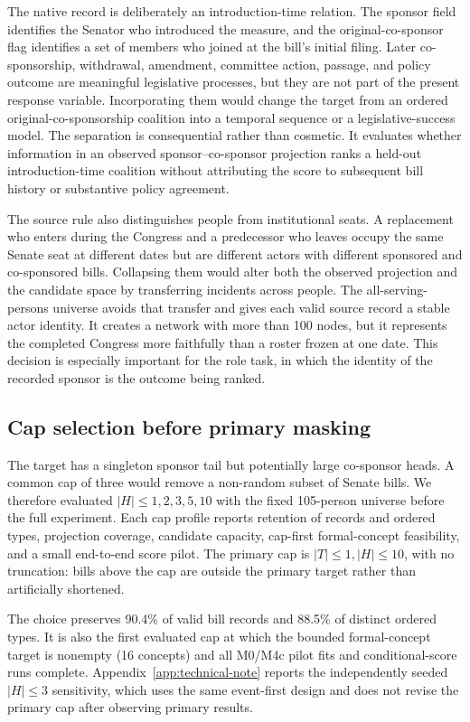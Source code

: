 \documentclass{nws}
\begin{document}
The native record is deliberately an introduction-time relation. The sponsor field identifies the Senator who introduced the measure, and the original-co-sponsor flag identifies a set of members who joined at the bill's initial filing. Later co-sponsorship, withdrawal, amendment, committee action, passage, and policy outcome are meaningful legislative processes, but they are not part of the present response variable. Incorporating them would change the target from an ordered original-co-sponsorship coalition into a temporal sequence or a legislative-success model. The separation is consequential rather than cosmetic. It evaluates whether information in an observed sponsor--co-sponsor projection ranks a held-out introduction-time coalition without attributing the score to subsequent bill history or substantive policy agreement.

The source rule also distinguishes people from institutional seats. A replacement who enters during the Congress and a predecessor who leaves occupy the same Senate seat at different dates but are different actors with different sponsored and co-sponsored bills. Collapsing them would alter both the observed projection and the candidate space by transferring incidents across people. The all-serving-persons universe avoids that transfer and gives each valid source record a stable actor identity. It creates a network with more than 100 nodes, but it represents the completed Congress more faithfully than a roster frozen at one date. This decision is especially important for the role task, in which the identity of the recorded sponsor is the outcome being ranked.

\subsection{Cap selection before primary masking}\label{sec:cap-selection}

The target has a singleton sponsor tail but potentially large co-sponsor heads. A common cap of three would remove a non-random subset of Senate bills. We therefore evaluated $|H|\leq1,2,3,5,10$ with the fixed 105-person universe before the full experiment. Each cap profile reports retention of records and ordered types, projection coverage, candidate capacity, cap-first formal-concept feasibility, and a small end-to-end score pilot. The primary cap is $|T|\leq1,|H|\leq10$, with no truncation: bills above the cap are outside the primary target rather than artificially shortened.

The choice preserves 90.4\% of valid bill records and 88.5\% of distinct ordered types. It is also the first evaluated cap at which the bounded formal-concept target is nonempty (16 concepts) and all M0/M4c pilot fits and conditional-score runs complete. Appendix~\ref{app:technical-note} reports the independently seeded $|H|\leq3$ sensitivity, which uses the same event-first design and does not revise the primary cap after observing primary results.
\end{document}
